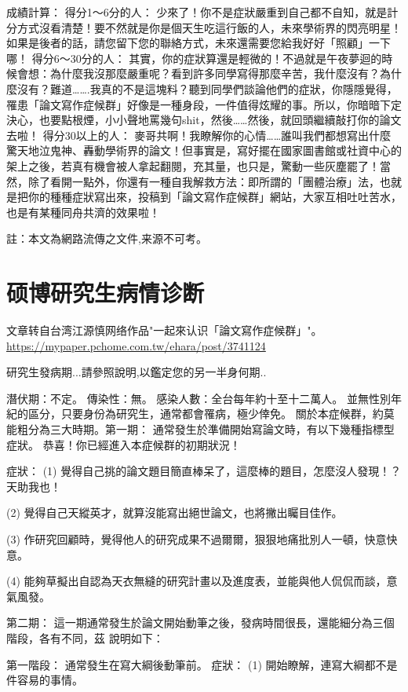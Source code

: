 成績計算： 
得分1～6分的人： 
少來了！你不是症狀嚴重到自己都不自知，就是計分方式沒看清楚！要不然就是你是個天生吃這行飯的人，未來學術界的閃亮明星！如果是後者的話，請您留下您的聯絡方式，未來還需要您給我好好「照顧」一下哪！ 
得分6～30分的人： 
其實，你的症狀算還是輕微的！不過就是午夜夢迴的時候會想：為什麼我沒那麼嚴重呢？看到許多同學寫得那麼辛苦，我什麼沒有？為什麼沒有？難道…….我真的不是這塊料？聽到同學們談論他們的症狀，你隱隱覺得，罹患「論文寫作症候群」好像是一種身段，一件值得炫耀的事。所以，你暗暗下定決心，也要點根煙，小小聲地罵幾句shit，然後……然後，就回頭繼續敲打你的論文去啦！ 
得分30以上的人： 
麥哥共啊！我瞭解你的心情……誰叫我們都想寫出什麼驚天地泣鬼神、轟動學術界的論文！但事實是，寫好擺在國家圖書館或社資中心的架上之後，若真有機會被人拿起翻閱，充其量，也只是，驚動一些灰塵罷了！當然，除了看開一點外，你還有一種自我解救方法：即所謂的「團體治療」法，也就是把你的種種症狀寫出來，投稿到「論文寫作症候群」網站，大家互相吐吐苦水，也是有某種同舟共濟的效果啦！

註：本文為網路流傳之文件,来源不可考。




\section{ 硕博研究生病情诊断}
\label{phd_diagnostic}
文章转自台湾江源慎网络作品"一起來认识「論文寫作症候群」"。\url{https://mypaper.pchome.com.tw/ehara/post/3741124}


研究生發病期...請參照說明,以鑑定您的另一半身何期..

潛伏期：不定。
傳染性：無。
感染人數：全台每年約十至十二萬人。
並無性別年紀的區分，只要身份為研究生，通常都會罹病，極少倖免。
關於本症候群，約莫能粗分為三大時期。第一期：
通常發生於準備開始寫論文時，有以下幾種指標型症狀。
恭喜！你已經進入本症候群的初期狀況！

症狀：
(1) 覺得自己挑的論文題目簡直棒呆了，這麼棒的題目，怎麼沒人發現！？天助我也！

(2) 覺得自己天縱英才，就算沒能寫出絕世論文，也將撇出矚目佳作。

(3) 作研究回顧時，覺得他人的研究成果不過爾爾，狠狠地痛批別人一頓，快意快意。

(4) 能夠草擬出自認為天衣無縫的研究計畫以及進度表，並能與他人侃侃而談，意氣風發。


第二期：
這一期通常發生於論文開始動筆之後，發病時間很長，還能細分為三個階段，各有不同，茲
說明如下：

第一階段：
通常發生在寫大綱後動筆前。
症狀：
(1) 開始瞭解，連寫大綱都不是件容易的事情。

